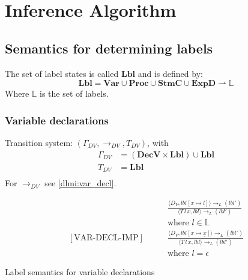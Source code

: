
\newcommand{\iVar}{\mathbf{Var}}
\newcommand{\iProc}{\mathbf{Proc}}
\newcommand{\iDecv}{\mathbf{DecV}}
\newcommand{\iDecp}{\mathbf{DecP}}
\newcommand{\iStmc}{\mathbf{StmC}}
\newcommand{\iExpd}{\mathbf{ExpD}}
\newcommand{\iLbl}{\mathbf{Lbl}}

\newcommand{\trtspc}{\hspace{2em}} %

\section{Inference Algorithm}

\subsection{Semantics for determining labels}
The set of label states is called $\iLbl$ and is defined by:
\[
  \iLbl = \iVar \cup \iProc \cup \iStmc \cup \iExpd \rightharpoonup \mathbb{L}
\]
Where $\mathbb{L}$ is the set of labels.

\subsubsection{Variable declarations}
Transition system: $(\Gamma_{DV}, \rightarrow_{DV}, T_{DV})$, with
\begin{align*}
  \Gamma_{DV} & = (\iDecv \times \iLbl) \cup \iLbl \\
  T_{DV} & = \iLbl \\
\end{align*}
For $\rightarrow_{DV}$ see \cref{dlmi:var_decl}.

\begin{table}
\begin{align*}
  [\text{VAR-DECL-EXP}] \trtspc & \frac{
    \langle D_V, lbl[x \mapsto l] \rangle \rightarrow_L (lbl')
  }{
    \langle T \, l \, x, lbl \rangle \rightarrow_L (lbl')
  }\\
  & \text{where } l \in \mathbb{L}\\[2em]
  [\text{VAR-DECL-IMP}] \trtspc & \frac{
    \langle D_V, lbl[x \mapsto \underline{x}] \rangle \rightarrow_L (lbl')
  }{
    \langle T \, l \, x, lbl \rangle \rightarrow_L (lbl')
  }\\
  & \text{where } l = \epsilon
\end{align*}
\caption{Label semantics for variable declarations}
\label{dlmi:var_decl}
\end{table}


